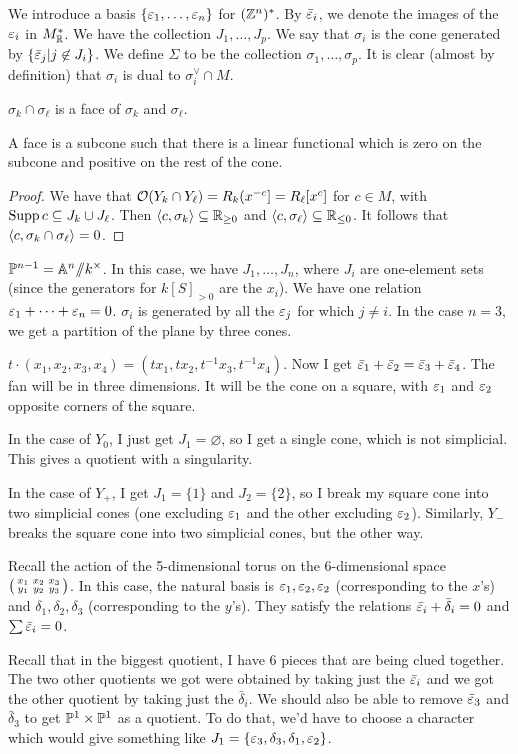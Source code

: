 We introduce a basis $\{\varepsilon_1,\dots, \varepsilon_n\}$ for $(\mathbb{Z}^n)^*$. By $\bar{\varepsilon}_i$, we denote the images of the $\varepsilon_i$ in $M^*_{\mathbb{R}}$. We have the collection $J_1,\dots, J_p$. We say that $\sigma_i$ is the cone generated by $\{\bar{\varepsilon}_j| j\not\in J_i\}$. We define $\Sigma$ to be the collection $\sigma_1,\dots, \sigma_p$. It is clear (almost by definition) that $\sigma_i$ is dual to $\sigma_i^\vee\cap M$.
\begin{lemma}
 $\sigma_k\cap\sigma_\ell$ is a face of $\sigma_k$ and $\sigma_\ell$.
\end{lemma}
A face is a subcone such that there is a linear functional which is zero on the subcone and positive on the rest of the cone.
\begin{proof}
 We have that $\mathcal{O}(Y_k\cap Y_\ell)=R_k(x^{-c}]=R_\ell[x^{c}]$ for $c\in M$, with $\operatorname{Supp} c\subseteq J_k\cup J_\ell$. Then $\langle c,\sigma_k\rangle\subseteq \mathbb{R}_{\ge 0}$ and $\langle c,\sigma_\ell\rangle\subseteq \mathbb{R}_{\le 0}$. It follows that $\langle c,\sigma_k\cap \sigma_\ell\rangle=0$.
\end{proof}
\begin{example}
 $\mathbb{P}^{n-1}=\mathbb{A}^n\mbox{\rm /\!\!/} k^\times$. In this case, we have $J_1,\dots, J_n$, where $J_i$ are one-element sets (since the generators for $k[S]_{>0}$ are the $x_i$). We have one relation $\varepsilon_1+\cdots +\varepsilon_n=0$. $\sigma_i$ is generated by all the $\varepsilon_j$ for which $j\neq i$. In the case $n=3$, we get a partition of the plane by three cones.
\end{example}
\begin{example}
 $t\cdot (x_1,x_2,x_3, x_4)=(tx_1,tx_2,t^{-1}x_3,t^{-1}x_4)$. Now I get $\bar{\varepsilon}_1+\bar{\varepsilon}_2=\bar{\varepsilon}_3+\bar{\varepsilon}_4$. The fan will be in three dimensions. It will be the cone on a square, with $\varepsilon_1$ and $\varepsilon_2$ opposite corners of the square.
 
 In the case of $Y_0$, I just get $J_1=\varnothing$, so I get a single cone, which is not simplicial. This gives a quotient with a singularity.
 
 In the case of $Y_+$, I get $J_1=\{1\}$ and $J_2=\{2\}$, so I break my square cone into two simplicial cones (one excluding $\varepsilon_1$ and the other excluding $\varepsilon_2$). Similarly, $Y_-$ breaks the square cone into two simplicial cones, but the other way.
\end{example}
\begin{example}
 Recall the action of the 5-dimensional torus on the 6-dimensional space $\bigl(\begin{smallmatrix} x_1&x_2&x_3\\ y_1&y_2&y_3 \end{smallmatrix}\bigr)$. In this case, the natural basis is $\varepsilon_1, \varepsilon_2, \varepsilon_2$ (corresponding to the $x$'s) and $\delta_1,\delta_2,\delta_3$ (corresponding to the $y$'s). They satisfy the relations $\bar{\varepsilon}_i+\bar\delta_i=0$ and $\sum \bar{\varepsilon}_i=0$.
 
 Recall that in the biggest quotient, I have 6 pieces that are being clued together. The two other quotients we got were obtained by taking just the $\bar{\varepsilon}_i$ and we got the other quotient by taking just the $\bar\delta_i$. We should also be able to remove $\bar {\varepsilon}_3$ and $\bar\delta_3$ to get $\mathbb{P}^1\times \mathbb{P}^1$ as a quotient. To do that, we'd have to choose a character which would give something like $J_1=\{\varepsilon_3,\delta_3,\delta_1,\varepsilon_2\}$.
\end{example}

